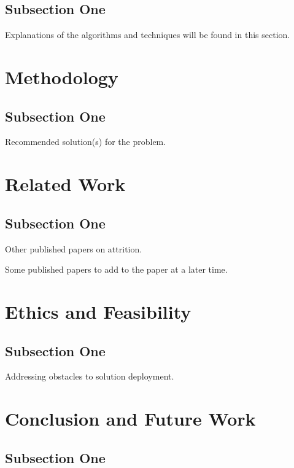 \documentclass{llncs}
\begin{document}
\subsection{Subsection One}

Explanations of the algorithms and techniques will be found in this section.

\section{Methodology}

\subsection{Subsection One}

Recommended solution(s) for the problem.

\section{Related Work}

\subsection{Subsection One}

Other published papers on attrition.

Some published papers to add to the paper at a later time. \cite{article2,article3,article4}

\section{Ethics and Feasibility}

\subsection{Subsection One}

Addressing obstacles to solution deployment.

\section{Conclusion and Future Work}

\subsection{Subsection One}
\end{document}
